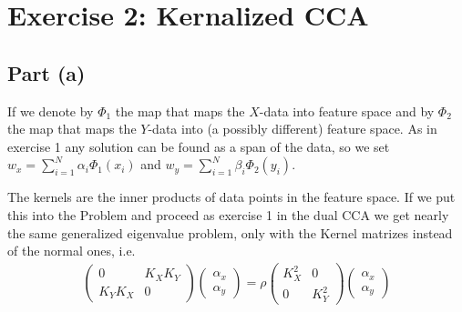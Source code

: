\section*{Exercise 2: Kernalized CCA}

\subsection*{Part (a)}

If we denote by $\Phi_1$ the map that maps the $X$-data into feature space and by $\Phi_2$ the map that maps the $Y$-data into (a possibly different) feature space. 
As in exercise 1 any solution can be found as a span of the data, so we set 
$w_x = \sum_{i=1}^{N}\alpha_i \Phi_1(x_i)$ and $w_y = \sum_{i=1}^{N}\beta_i \Phi_2(y_i)$.

The kernels are the inner products of data points in the feature space.
If we put this into the Problem and proceed as exercise 1 in the dual CCA we get nearly the same generalized eigenvalue problem, only with the Kernel matrizes instead of the normal ones, i.e. 
\begin{align*}
\begin{pmatrix}
0 & K_XK_Y \\
K_YK_X & 0
\end{pmatrix} \begin{pmatrix}
\alpha_x \\ \alpha_y
\end{pmatrix}
= \rho 
\begin{pmatrix}
K_X^2 & 0 \\
0 & K_Y^2 
\end{pmatrix}
\begin{pmatrix}
\alpha_x \\ \alpha_y
\end{pmatrix}
\end{align*}